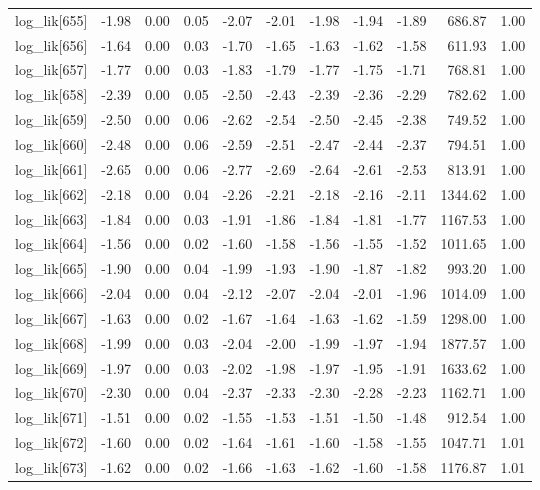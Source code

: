 \begin{table}[ht]
\begin{tabular}{rrrrrrrrrrr}
  log\_lik[655] & -1.98 & 0.00 & 0.05 & -2.07 & -2.01 & -1.98 & -1.94 & -1.89 & 686.87 & 1.00 \\ 
  log\_lik[656] & -1.64 & 0.00 & 0.03 & -1.70 & -1.65 & -1.63 & -1.62 & -1.58 & 611.93 & 1.00 \\ 
  log\_lik[657] & -1.77 & 0.00 & 0.03 & -1.83 & -1.79 & -1.77 & -1.75 & -1.71 & 768.81 & 1.00 \\ 
  log\_lik[658] & -2.39 & 0.00 & 0.05 & -2.50 & -2.43 & -2.39 & -2.36 & -2.29 & 782.62 & 1.00 \\ 
  log\_lik[659] & -2.50 & 0.00 & 0.06 & -2.62 & -2.54 & -2.50 & -2.45 & -2.38 & 749.52 & 1.00 \\ 
  log\_lik[660] & -2.48 & 0.00 & 0.06 & -2.59 & -2.51 & -2.47 & -2.44 & -2.37 & 794.51 & 1.00 \\ 
  log\_lik[661] & -2.65 & 0.00 & 0.06 & -2.77 & -2.69 & -2.64 & -2.61 & -2.53 & 813.91 & 1.00 \\ 
  log\_lik[662] & -2.18 & 0.00 & 0.04 & -2.26 & -2.21 & -2.18 & -2.16 & -2.11 & 1344.62 & 1.00 \\ 
  log\_lik[663] & -1.84 & 0.00 & 0.03 & -1.91 & -1.86 & -1.84 & -1.81 & -1.77 & 1167.53 & 1.00 \\ 
  log\_lik[664] & -1.56 & 0.00 & 0.02 & -1.60 & -1.58 & -1.56 & -1.55 & -1.52 & 1011.65 & 1.00 \\ 
  log\_lik[665] & -1.90 & 0.00 & 0.04 & -1.99 & -1.93 & -1.90 & -1.87 & -1.82 & 993.20 & 1.00 \\ 
  log\_lik[666] & -2.04 & 0.00 & 0.04 & -2.12 & -2.07 & -2.04 & -2.01 & -1.96 & 1014.09 & 1.00 \\ 
  log\_lik[667] & -1.63 & 0.00 & 0.02 & -1.67 & -1.64 & -1.63 & -1.62 & -1.59 & 1298.00 & 1.00 \\ 
  log\_lik[668] & -1.99 & 0.00 & 0.03 & -2.04 & -2.00 & -1.99 & -1.97 & -1.94 & 1877.57 & 1.00 \\ 
  log\_lik[669] & -1.97 & 0.00 & 0.03 & -2.02 & -1.98 & -1.97 & -1.95 & -1.91 & 1633.62 & 1.00 \\ 
  log\_lik[670] & -2.30 & 0.00 & 0.04 & -2.37 & -2.33 & -2.30 & -2.28 & -2.23 & 1162.71 & 1.00 \\ 
  log\_lik[671] & -1.51 & 0.00 & 0.02 & -1.55 & -1.53 & -1.51 & -1.50 & -1.48 & 912.54 & 1.00 \\ 
  log\_lik[672] & -1.60 & 0.00 & 0.02 & -1.64 & -1.61 & -1.60 & -1.58 & -1.55 & 1047.71 & 1.01 \\ 
  log\_lik[673] & -1.62 & 0.00 & 0.02 & -1.66 & -1.63 & -1.62 & -1.60 & -1.58 & 1176.87 & 1.01 \\ 

\end{tabular}
\end{table}
